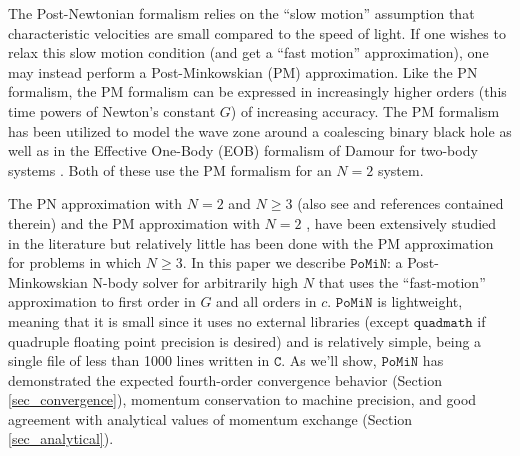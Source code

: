 \documentclass[aps,onecolumn,notitlepage,eqsecnum,nofootinbib,floatfix,superscriptaddress]{revtex4-1}
\newcommand{\codename}{\mathtt{PoMiN}}
\begin{document}
The Post-Newtonian formalism relies on the ``slow motion'' assumption that characteristic velocities are small compared to the speed of light.  If one wishes to relax this slow motion condition (and get a ``fast motion'' approximation), one may instead perform a Post-Minkowskian (PM) approximation. Like the PN formalism, the PM formalism can be expressed in increasingly higher orders (this time powers of Newton’s constant $G$) of increasing accuracy. The PM formalism has been utilized to model the wave zone around a coalescing binary black hole \cite{Blanchet} as well as in the Effective One-Body (EOB) formalism of Damour for two-body systems \cite{EOB}.  Both of these use the PM formalism for an $N=2$ system.

The PN approximation with $N=2$ and $N \geq 3$ 
\cite{Futamase2007,Itoh2009,Schafer1987,LoustoNakano2008,Kupi2006,Bremetal2013,Aarseth2007,Will2013,Will2014}
(also see \cite{Blanchet} and references contained therein)
and the PM approximation with $N=2$ 
\cite{Blanchet,EOB,Westpfahl1979,Portilla1979,Portilla1980,Beletal1981,Westpfahl1985,Westpfahletal1987}, 
have been extensively studied in the literature but relatively little has been done with the PM approximation for problems in which $N \geq 3$.  In this paper we describe $\codename$: a Post-Minkowskian N-body solver for arbitrarily high $N$ that uses the ``fast-motion'' approximation to first order in $G$ and all orders in $c$.  $\codename$ is lightweight, meaning that it is small since it uses no external libraries (except $\mathtt{quadmath}$ if quadruple floating point precision is desired) and is relatively simple, being a single file of less than 1000 lines written in $\mathtt{C}$.  As we'll show, $\codename$ has demonstrated the expected fourth-order convergence behavior (Section \ref{sec_convergence}), momentum conservation to machine precision, and good agreement with analytical values of momentum exchange (Section \ref{sec_analytical}).
\end{document}

